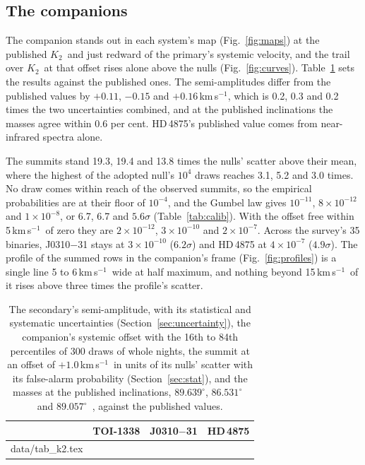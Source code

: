\documentclass[3p,11pt]{elsarticle}
\makeatletter
\newcommand{\tabinput}[1]{\@@input #1 }
\newcommand{\kms}{km\,s$^{-1}$}
\newcommand{\Ktwo}{$K_2$}
\makeatother
\begin{document}
\subsection{The companions}

The companion stands out in each system's map (Fig.~\ref{fig:maps}) at the published \Ktwo\ and
just redward of the primary's systemic velocity, and the trail over \Ktwo\ at that offset rises
alone above the nulls (Fig.~\ref{fig:curves}). Table~\ref{tab:k2} sets the results against the
published ones. The semi-amplitudes differ from the published values by $+0.11$, $-0.15$ and
$+0.16$\,\kms, which is 0.2, 0.3 and 0.2 times the two uncertainties combined, and at the published
inclinations the masses agree within 0.6 per cent. HD\,4875's published value comes from
near-infrared spectra alone.

The summits stand 19.3, 19.4 and 13.8 times the nulls' scatter above their mean, where the highest
of the adopted null's $10^4$ draws reaches 3.1, 5.2 and 3.0 times. No draw comes within reach of
the observed summits, so the empirical probabilities are at their floor of $10^{-4}$, and
the Gumbel law gives $10^{-11}$, $8\times10^{-12}$ and $1\times10^{-8}$, or 6.7, 6.7 and
$5.6\sigma$ (Table~\ref{tab:calib}). With the offset free within 5\,\kms\ of zero they are
$2\times10^{-12}$, $3\times10^{-10}$ and $2\times10^{-7}$. Across the survey's 35 binaries,
J0310$-$31 stays at $3\times10^{-10}$ ($6.2\sigma$) and HD\,4875 at $4\times10^{-7}$ ($4.9\sigma$).
The profile of the summed rows in the companion's frame (Fig.~\ref{fig:profiles}) is a single line
5 to 6\,\kms\ wide at half maximum, and nothing beyond 15\,\kms\ of it rises above three times the
profile's scatter.

\begin{table}[t]
\centering
\caption{The secondary's semi-amplitude, with its statistical and systematic uncertainties
(Section~\ref{sec:uncertainty}), the companion's systemic offset with the 16th to 84th percentiles
of 300 draws of whole nights, the summit at an offset of $+1.0$\,\kms\ in units of its nulls'
scatter with its false-alarm probability (Section~\ref{sec:stat}), and the masses at the published
inclinations, $89.639^\circ$, $86.531^\circ$~\cite{Stevenson2026} and
$89.057^\circ$~\cite{Hahlin2026}, against the published values.}\label{tab:k2}
\small\setlength{\tabcolsep}{4pt}
\begin{tabular}{lccc}
\toprule
 & TOI-1338 & J0310$-$31 & HD\,4875\\
\midrule
\tabinput{data/tab_k2.tex}
\bottomrule
\end{tabular}
\end{table}
\end{document}
